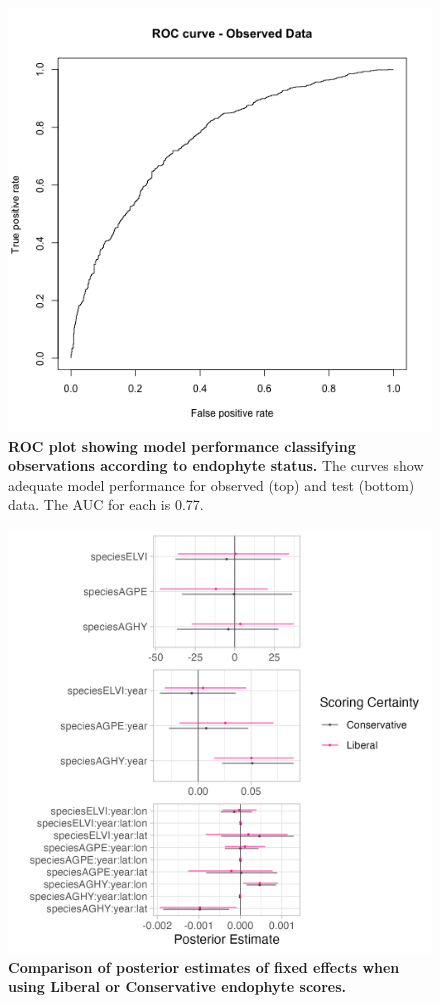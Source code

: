 \documentclass[11pt]{article}
\begin{document}
	
	\begin{figure}[H]
		\centering
		\includegraphics[width = .5\linewidth]{ROC_plot.png}
		\caption{\textbf{ROC plot showing model performance classifying observations according to endophyte status.} The curves show adequate model performance for observed (top) and test (bottom) data. The AUC for each is 0.77.}
	\end{figure}

\begin{figure}[H]
	\centering
	\includegraphics[width = \linewidth]{fixed_plot.png}
	\caption{\textbf{Comparison of posterior estimates of fixed effects when using Liberal or Conservative endophyte scores.}}
\end{figure}
\end{document}
